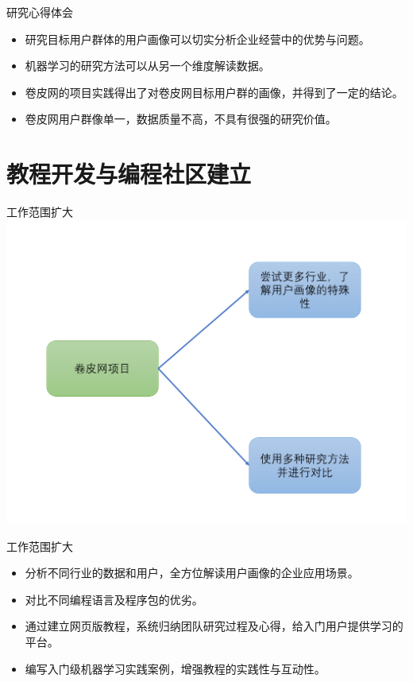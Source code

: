 \documentclass[10pt]{beamer}
\begin{document}
\begin{frame}{研究心得体会}
  \begin{itemize}
    \item 研究目标用户群体的用户画像可以切实分析企业经营中的优势与问题。\newline
    \item 机器学习的研究方法可以从另一个维度解读数据。\newline
    \item 卷皮网的项目实践得出了对卷皮网目标用户群的画像，并得到了一定的结论。\newline
    \item 卷皮网用户群像单一，数据质量不高，不具有很强的研究价值。\newline
  \end{itemize}
\end{frame}

\section{教程开发与编程社区建立}

\begin{frame}{工作范围扩大}
\includegraphics[height=0.7\paperheight]{amplify}
\end{frame}

\begin{frame}{工作范围扩大}
   \begin{itemize}
      \item 分析不同行业的数据和用户，全方位解读用户画像的企业应用场景。\newline
      \item 对比不同编程语言及程序包的优劣。\newline
      \item 通过建立网页版教程，系统归纳团队研究过程及心得，给入门用户提供学习的平台。\newline
      \item 编写入门级机器学习实践案例，增强教程的实践性与互动性。
   \end{itemize}
\end{frame}
\end{document}
